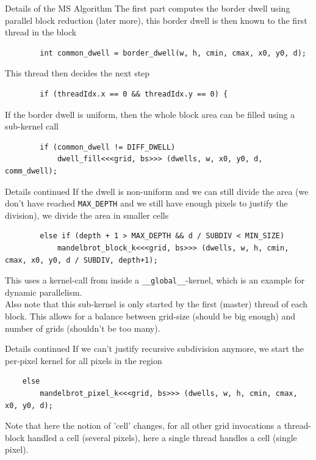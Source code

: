 \documentclass[fleqn,11pt,aspectratio=43]{beamer}
\begin{document}
\begin{frame}[fragile]{Details of the MS Algorithm}
	The first part computes the border dwell using parallel block reduction (later more), this border dwell is then known to the first thread in the block
	\begin{verbatim}
		int common_dwell = border_dwell(w, h, cmin, cmax, x0, y0, d);
	\end{verbatim}
	This thread then decides the next step
	\begin{verbatim}
		if (threadIdx.x == 0 && threadIdx.y == 0) {
	\end{verbatim}
	If the border dwell is uniform, then the whole block area can be filled using a sub-kernel call
	\begin{verbatim}
		if (common_dwell != DIFF_DWELL) 
			dwell_fill<<<grid, bs>>> (dwells, w, x0, y0, d, comm_dwell);
	\end{verbatim}
\end{frame}

\begin{frame}[fragile]{Details continued}
	If the dwell is non-uniform and we can still divide the area (we don't have reached \texttt{MAX\_DEPTH} and we still have enough pixels to justify the division), we divide the area in smaller cells
	\begin{verbatim}
		else if (depth + 1 > MAX_DEPTH && d / SUBDIV < MIN_SIZE)
			mandelbrot_block_k<<<grid, bs>>> (dwells, w, h, cmin, cmax, x0, y0, d / SUBDIV, depth+1);
	\end{verbatim} 
	This uses a kernel-call from inside a \texttt{\_\_global\_\_}-kernel, which is an example for dynamic parallelism.\\
	Also note that this sub-kernel is only started by the first (master) thread of each block. This allows for a balance between grid-size (should be big enough) and number of grids (shouldn't be too many).
\end{frame}

\begin{frame}[fragile]{Details continued}
	If we can't justify recursive subdivision anymore, we start the per-pixel kernel for all pixels in the region
	\begin{verbatim}
	else
		mandelbrot_pixel_k<<<grid, bs>>> (dwells, w, h, cmin, cmax, x0, y0, d);
	\end{verbatim}
	Note that here the notion of 'cell' changes, for all other grid invocations a thread-block handled a cell (several pixels), here a single thread handles a cell (single pixel).
\end{frame}
\end{document}
